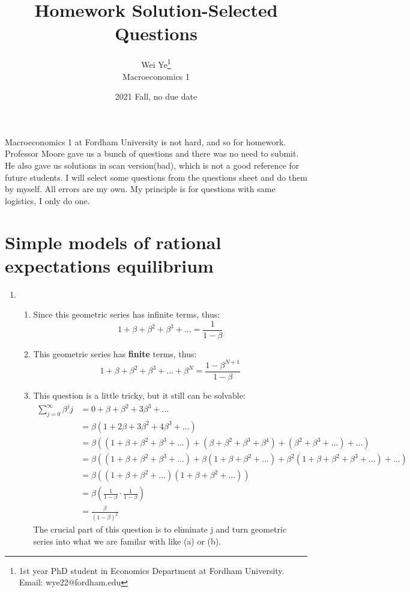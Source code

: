 \documentclass[11pt]{article} %
\title{Homework Solution-Selected Questions}
\author{Wei Ye\footnote{ 1st year PhD student in Economics Department at Fordham University. Email: wye22@fordham.edu}
    \\ Macroeconomics 1}
\date{2021 Fall, no due date}
\begin{document}
	\maketitle
Macroeconomics 1 at Fordham University is not hard, and so for homework. Professor Moore gave us a bunch of questions and there was no need to submit. 
He also gave us solutions in scan version(bad), which is not a good reference for future students. I will select some questions from the questions sheet and do them by myself.
All errors are my own. My principle is for questions with same logistics, I only do one. 

\section{Simple models of rational expectations equilibrium}
\begin{enumerate}
    \item
    \begin{enumerate}
    \item Since this geometric series has infinite terms, thus: \begin{equation*}
        1+\beta+\beta^2+\beta^3+...=\frac{1}{1-\beta}
    \end{equation*}
    \item This geometric series has \textbf{finite} terms, thus:
        \begin{equation*}
            1+\beta+\beta^2+\beta^3+...+\beta^N=\frac{1-\beta^{N+1}}{1-\beta}
        \end{equation*}
    \item This question is a little tricky, but it still can be solvable:
    \begin{align*}
        \sum_{j=0}^\infty \beta^j j&= 0+\beta+\beta^2+3\beta^3+...\\
                &=\beta(1+2\beta+3\beta^2+4\beta^3+...)\\
                &=\beta((1+\beta+\beta^2+\beta^3+...)+(\beta+\beta^2+\beta^3+\beta^4)+(\beta^2+\beta^3+...)+...)\\
                &=\beta((1+\beta+\beta^2+\beta^3+...)+\beta(1+\beta+\beta^2+...)+\beta^2(1+\beta+\beta^2+\beta^3+...)+...)\\
                &=\beta((1+\beta+\beta^2+...)(1+\beta+\beta^2+...))\\
                &=\beta(\frac{1}{1-\beta}\cdot \frac{1}{1-\beta})\\
                &=\frac{\beta}{(1-\beta)^2}
    \end{align*}
    The crucial part of this question is to eliminate j and turn geometric series into what we are familar with like (a) or (b). 
    \end{enumerate}


\end{enumerate}
\end{document}
